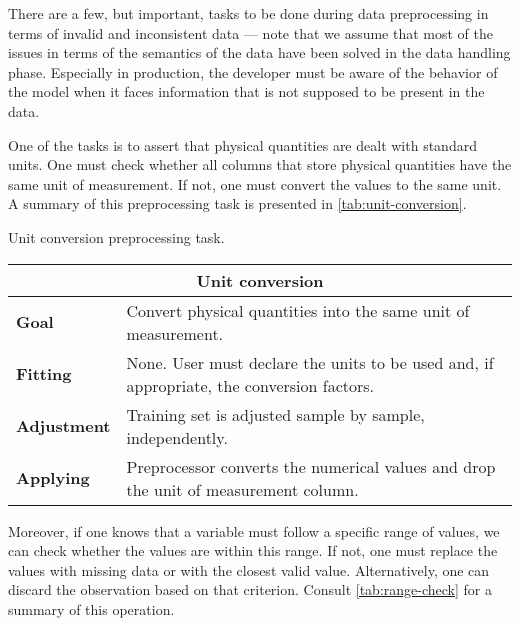 There are a few, but important, tasks to be done during data preprocessing in terms of
invalid and inconsistent data --- note that we assume that most of the issues in terms of
the semantics of the data have been solved in the data handling phase.  Especially in
production, the developer must be aware of the behavior of the model when it faces
information that is not supposed to be present in the data.

One of the tasks is to assert that physical quantities are dealt with standard units.  One must
check whether all columns that store physical quantities have the same unit of
measurement.  If not, one must convert the values to the same unit.  A summary of this
preprocessing task is presented in \cref{tab:unit-conversion}.

\begin{tablebox}[label=tab:unit-conversion]{Unit conversion preprocessing task.}
  \centering
  \begin{tabular}{lp{6cm}}
    \toprule
    \multicolumn{2}{c}{\textbf{Unit conversion}} \\
    \midrule
    \textbf{Goal} &
      Convert physical quantities into the same unit of measurement. \\
    \textbf{Fitting} &
      None. User must declare the units to be used and, if appropriate, the conversion
      factors. \\
    \textbf{Adjustment} &
      Training set is adjusted sample by sample, independently. \\
    \textbf{Applying} &
      Preprocessor converts the numerical values and drop the unit of measurement column.  \\
    \bottomrule
  \end{tabular}
\end{tablebox}

Moreover, if one knows that a variable must follow a specific range of values, we can check
whether the values are within this range.  If not, one must replace the values with
missing data or with the closest valid value.  Alternatively, one can discard the
observation based on that criterion.  Consult \cref{tab:range-check} for a summary of this
operation.

